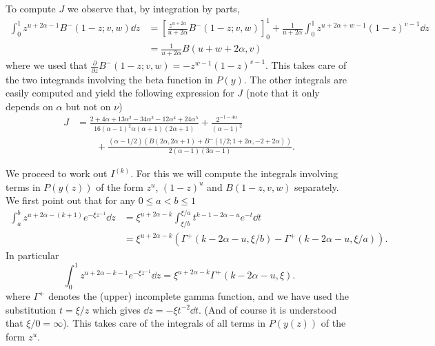 To compute $J$ we observe that, by integration by parts, 
\begin{align*}
	\int_0^1 z^{u+2\alpha-1} B^-(1-z;v,w) \dd z 
	&= \left[ \frac{z^{u+2\alpha}}{u+2\alpha} B^-(1-z;v,w) \right]_0^1 
		+ \frac{1}{u+2\alpha} \int_0^1 z^{u+2\alpha+w-1} (1-z)^{v-1} \dd z \\
	&= \frac{1}{u+2\alpha} B(u+w+2\alpha,v)
\end{align*}
where we used that $\frac{\partial}{\partial z} B^-(1-z;v,w) = - z^{w-1} (1-z)^{v-1}$. This takes care of the two integrands involving the beta function in $P(y)$. The other integrals are easily computed and yield the following expression for $J$ (note that it only depends on $\alpha$ but not on $\nu$)
\begin{align*}
J&=\frac{2 + 4 \alpha + 13 \alpha^2 - 34 \alpha^3 - 12\alpha^4 + 
	24 \alpha^5}{16(\alpha-1)^2 \alpha (\alpha+1) (2\alpha+1)} +  \frac{2^{-1 - 
		4 \alpha}}{(\alpha - 1)^2} \\
	&\qquad+ \frac{(\alpha - 1/2) (B(2 \alpha, 2 \alpha + 1) + 
	B^-(1/2; 1 + 2 \alpha, -2 + 2 \alpha))}{2 (\alpha - 1) (3 \alpha - 1)}.
\end{align*}

We proceed to work out $I^{(k)}$. For this we will compute the integrals involving terms in $P(y(z))$ of the form $z^u$, $(1-z)^u$ and $B(1-z,v,w)$ separately. We first point out that for any $0 \le a < b \le 1$
\begin{align*}
	\int_a^b z^{u+2\alpha-(k+1)} e^{-\xi z^{-1}} \dd z
	&= \xi^{u+2\alpha-k} \int_{\xi/b}^{\xi/a} t^{k-1-2\alpha-u} e^{-t} \dd t \\
	&= \xi^{u+2\alpha-k} \left( \Gamma^+( k-2\alpha-u,\xi/b) - \Gamma^+( k-2\alpha-u, \xi/a) \right).
\end{align*}
In particular
\begin{equation}\label{eq:integral_Delta_P_z}
	\int_0^1 z^{u+2\alpha-k-1} e^{-\xi z^{-1}} \dd z = \xi^{u+2\alpha-k} \Gamma^+(k-2\alpha-u,\xi).
\end{equation}
where $\Gamma^+$ denotes the (upper) incomplete gamma function, and we have used the substitution
$t = \xi / z$ which gives $\dd z = -\xi t^{-2} \dd t$. (And of course it is understood that 
$\xi/0 = \infty$). This takes care of the integrals of all terms in $P(y(z))$ of the form $z^{u}$. 


